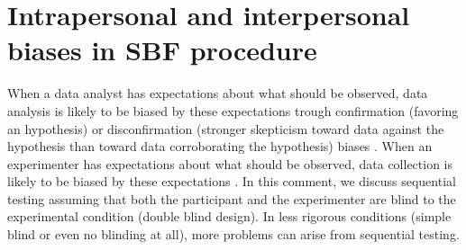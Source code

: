 \documentclass[a4paper,man,natbib,floatsintext,donotrepeattitle]{apa6}
\begin{document}

\section{Intrapersonal and interpersonal biases in SBF procedure}

When a data analyst has expectations about what should be observed, data analysis is likely to be biased by these expectations trough confirmation (favoring an hypothesis) or disconfirmation (stronger skepticism toward data against the hypothesis than toward data corroborating the hypothesis) biases \citep{lilienfeld_blind_2017}. When an experimenter has expectations about what should be observed, data collection is likely to be biased by these expectations \citep{orne_social_1962,rosenthal_social_1963,rosenthal_experimenter_1964,tuyttens_opinion_2016,zoble_interaction_1969}.
In this comment, we discuss sequential testing assuming that both the participant and the experimenter are blind to the experimental condition (double blind design). In less rigorous conditions (simple blind or even no blinding at all), more problems can arise from sequential testing. \par
\end{document}
